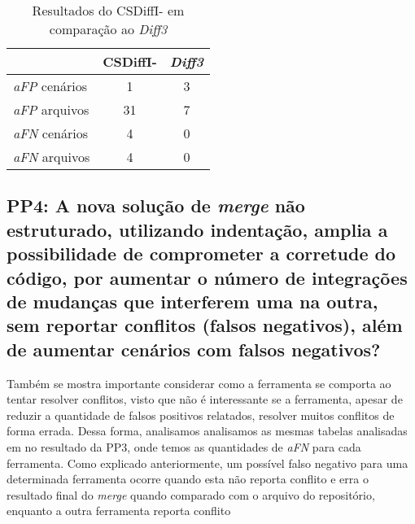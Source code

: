 \begin{table}[ht]
	\begin{center}
		\begin{tabular}{|l|c|c|}
			\hline
			\textbf{ }   & \textbf{CSDiffI-} & \textbf{\emph{Diff3}} \\
			\hline
			\emph{aFP} cenários & 1                 & 3                     \\
			\emph{aFP} arquivos & 31                & 7                     \\
			\emph{aFN} cenários & 4                 & 0                     \\
			\emph{aFN} arquivos & 4                 & 0                     \\
			\hline
		\end{tabular}
	\end{center}
	\caption{Resultados do CSDiffI- em comparação ao \emph{Diff3}}\label{csdiff_indentation_minus_afp_afn}
\end{table}


\subsection{PP4: A nova solução de \emph{merge} não estruturado, utilizando indentação,
	amplia a possibilidade de comprometer a corretude do código, por aumentar o número de
	integrações de mudanças que interferem uma na outra, sem reportar conflitos (falsos negativos),
	além de aumentar cenários com falsos negativos?}
Também se mostra importante considerar como a ferramenta se comporta ao tentar resolver conflitos, visto que não é interessante
se a ferramenta, apesar de reduzir a quantidade de falsos positivos relatados, resolver muitos conflitos de forma errada.
Dessa forma, analisamos analisamos as mesmas tabelas analisadas em no resultado da PP3, onde temos as quantidades de \emph{aFN} para cada
ferramenta. Como explicado anteriormente,
um possível falso negativo para uma determinada ferramenta ocorre quando esta não reporta
conflito e erra o resultado final do \emph{merge} quando comparado com o arquivo do repositório,
enquanto a outra ferramenta reporta conflito

